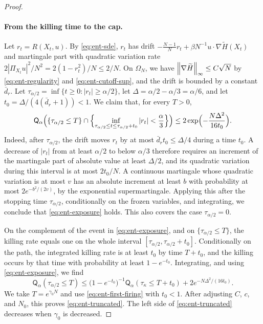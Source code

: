 \begin{proof}
\paragraph{From the killing time to the cap.}
Let $r_t=R(X_t,u)$. By \eqref{eq:ent-sde}, $r_t$ has drift
$-\frac{N-1}{N}r_t+\beta N^{-1}u\cdot\nabla\widetilde H(X_t)$ and
martingale part with quadratic variation rate $2|\Pi_{X_t}u|^2/N^2
=2(1-r_t^2)/N\le2/N$. On $\Omega_N$, we have $\left\lVert\nabla\widetilde H\right\rVert_\infty\le C\sqrt N$ by
\eqref{eq:ent-regularity} and \eqref{eq:ent-cutoff-sup}, and the drift is
bounded by a constant $\bar d_r$. Let
$\tau_{\alpha/2}=\inf\{t\ge0:|r_t|\ge\alpha/2\}$, let
$\Delta=\alpha/2-\alpha/3=\alpha/6$, and let $t_0=\Delta/(4(\bar d_r+1))<1$. We
claim that, for every $T>0$,
\begin{equation}\label{eq:ent-exposure}
 \mathsf Q_\alpha\Bigl(\{\tau_{\alpha/2}\le T\}\cap
 \Bigl\{\inf_{\tau_{\alpha/2}\le t\le\tau_{\alpha/2}+t_0}|r_t|<\frac\alpha3
 \Bigr\}\Bigr)\le2\exp\Bigl(-\frac{N\Delta^2}{16t_0}\Bigr).
\end{equation}
Indeed, after $\tau_{\alpha/2}$, the drift moves $r_t$ by at most
$\bar d_rt_0\le\Delta/4$ during a time $t_0$. A decrease of $|r_t|$ from at least
$\alpha/2$ to below $\alpha/3$ therefore requires an increment of the
martingale part of absolute value at least $\Delta/2$, and its quadratic
variation during this interval is at most $2t_0/N$. A continuous martingale
whose quadratic variation is at most $v$ has an absolute increment at least
$b$ with probability at most $2e^{-b^2/(2v)}$, by the exponential
supermartingale. Applying this after the stopping time $\tau_{\alpha/2}$,
conditionally on the frozen variables, and integrating, we conclude that
\eqref{eq:ent-exposure} holds. This also covers the case $\tau_{\alpha/2}=0$.

On the complement of the event in \eqref{eq:ent-exposure}, and on
$\{\tau_{\alpha/2}\le T\}$, the killing rate equals one on the whole interval
$[\tau_{\alpha/2},\tau_{\alpha/2}+t_0]$. Conditionally on the path, the
integrated killing rate is at least $t_0$ by time $T+t_0$, and the killing occurs
by that time with probability at least $1-e^{-t_0}$. Integrating, and using \eqref{eq:ent-exposure}, we find
\[
 \mathsf Q_\alpha(\tau_{\alpha/2}\le T)\le\bigl(1-e^{-t_0}\bigr)^{-1}
 \mathsf Q_\alpha(\tau_\kappa\le T+t_0)+2e^{-N\Delta^2/(16t_0)}.
\]
We take $T=e^{\gamma_0N}$ and use \eqref{eq:ent-first-firing} with $t_0<1$.
After adjusting $C$, $c$, and $N_0$, this proves \eqref{eq:ent-truncated}.
The left side of \eqref{eq:ent-truncated} decreases when $\gamma_0$ is
decreased.
\end{proof}


